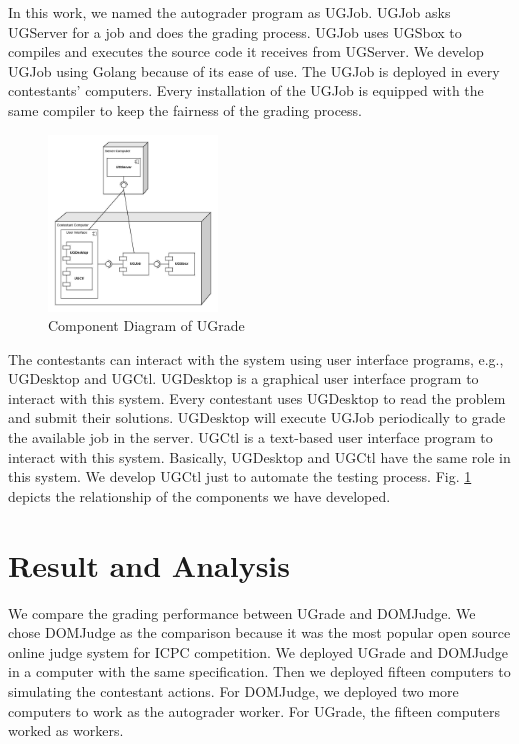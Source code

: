 \documentclass[conference,a4paper]{IEEEtran}
\begin{document}
In this work, we named the autograder program as UGJob. UGJob asks UGServer for a job and does the grading process. UGJob uses UGSbox to compiles and executes the source code it receives from UGServer. We develop UGJob using Golang because of its ease of use. The UGJob is deployed in every contestants' computers. Every installation of the UGJob is equipped with the same compiler to keep the fairness of the grading process.

\begin{figure}[htbp]
\centerline{\includegraphics[width=0.4\textwidth]{images/paper-component.jpeg}}
\caption{Component Diagram of UGrade}
\label{component}
\end{figure}

The contestants can interact with the system using user interface programs, e.g., UGDesktop and UGCtl. UGDesktop is a graphical user interface program to interact with this system. Every contestant uses UGDesktop to read the problem and submit their solutions. UGDesktop will execute UGJob periodically to grade the available job in the server. UGCtl is a text-based user interface program to interact with this system. Basically, UGDesktop and UGCtl have the same role in this system. We develop UGCtl just to automate the testing process. Fig. \ref{component} depicts the relationship of the components we have developed.

\section{Result and Analysis}

We compare the grading performance between UGrade and DOMJudge. We chose DOMJudge as the comparison because it was the most popular open source online judge system for ICPC competition. We deployed UGrade and DOMJudge in a computer with the same specification. Then we deployed fifteen computers to simulating the contestant actions. For DOMJudge, we deployed two more computers to work as the autograder worker. For UGrade, the fifteen computers worked as workers.
\end{document}
